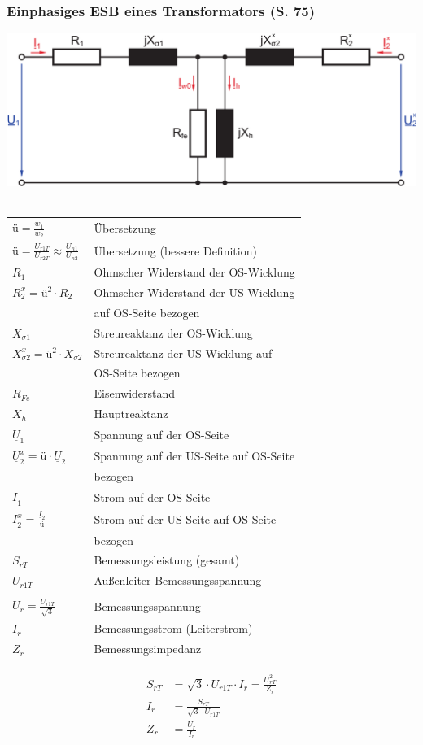 \documentclass[a4paper,twocolumn,10pt]{article}
\begin{document}
\subsubsection{Einphasiges ESB eines Transformators (S. 75)}
\includegraphics[width=0.9\columnwidth]{Grafiken/Trafo_ESB}\\\\
\begin{tabular}{ll}
$\text{ü}=\frac{w_1}{w_2}$ & Übersetzung\\
$\text{ü}=\frac{U_{r1T}}{U_{r2T}}\approx\frac{U_{n1}}{U_{n2}}$ & Übersetzung (bessere Definition)\\
$R_1$ & Ohmscher Widerstand der OS-Wicklung\\
$R_2^x=\text{ü}^2\cdot R_2$ & Ohmscher Widerstand der US-Wicklung\\
& auf OS-Seite bezogen\\
$X_{\sigma 1}$ & Streureaktanz der OS-Wicklung\\
$X_{\sigma2}^x=\text{ü}^2\cdot X_{\sigma 2}$ & Streureaktanz der US-Wicklung auf\\
&OS-Seite bezogen\\
$R_{Fe}$ & Eisenwiderstand\\
$X_h$ & Hauptreaktanz\\
$\underline{U}_1$ & Spannung auf der OS-Seite\\
$\underline{U}_2^x=\text{ü}\cdot\underline{U}_2$ & Spannung auf der US-Seite auf OS-Seite\\
& bezogen\\
$\underline{I}_1$ & Strom auf der OS-Seite\\
$\underline{I}_2^x=\frac{\underline{I}_2}{\text{ü}}$ & Strom auf der US-Seite auf OS-Seite\\
& bezogen\\
$S_{rT}$ & Bemessungsleistung (gesamt)\\
$U_{r1T}$ & Außenleiter-Bemessungsspannung\\\\
$U_r=\frac{U_{r1T}}{\sqrt{3}}$ & Bemessungsspannung\\
$I_r$ & Bemessungsstrom (Leiterstrom)\\
$Z_r$ & Bemessungsimpedanz
\end{tabular}
\begin{equation*}
\begin{split}
S_{rT}&=\sqrt{3}\cdot U_{r1T}\cdot I_r=\frac{U_{rT}^2}{Z_{r}}\\
I_r&=\frac{S_{rT}}{\sqrt{3}\cdot U_{r1T}}\\
Z_r&=\frac{U_r}{I_r}
\end{split}
\end{equation*}
\end{document}
